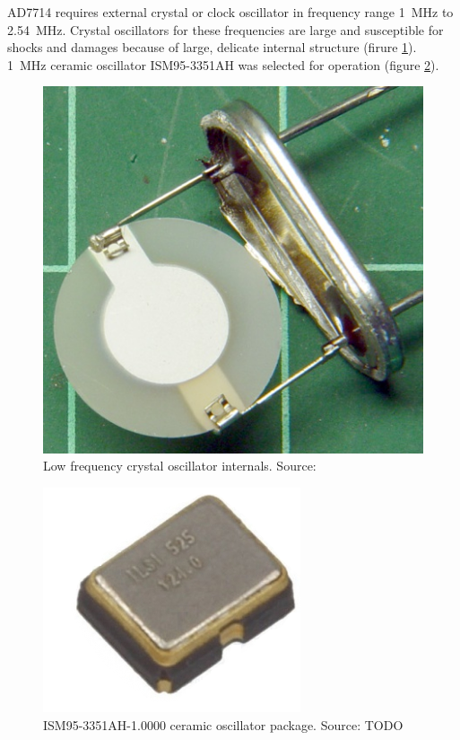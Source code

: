         AD7714 requires external crystal or clock oscillator in frequency range \SI{1}{\mega\hertz} to \SI{2.54}{\mega\hertz}. Crystal oscillators for these frequencies are large and susceptible for shocks and damages because of large, delicate internal structure (firure \ref{Opening_a_Quartz_Crystal_Can_Effects_Thereof}). \SI{1}{\mega\hertz} ceramic oscillator ISM95-3351AH was selected for operation (figure \ref{ISM95-3351AH-1.0000}).

        \begin{figure}[H]
            \centering
            \includegraphics[width=0.5\paperwidth]{img/06/crystal.png}
            \caption{Low frequency crystal oscillator internals. Source: \cite{        Opening_a_Quartz_Crystal_Can_Effects_Thereof}}
            \label{Opening_a_Quartz_Crystal_Can_Effects_Thereof}
        \end{figure}

        \begin{figure}[H]
            \centering
            \includegraphics[width=0.5\paperwidth]{img/06/ISM95.png}
            \caption{ISM95-3351AH-1.0000 ceramic oscillator package. Source: TODO}
            \label{ISM95-3351AH-1.0000}
        \end{figure}


